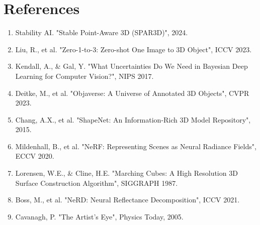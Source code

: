 \documentclass[10pt,journal,compsoc]{IEEEtran}
\begin{document}
\section*{References}
\begin{enumerate}
    \item Stability AI. "Stable Point-Aware 3D (SPAR3D)", 2024.
    \item Liu, R., et al. "Zero-1-to-3: Zero-shot One Image to 3D Object", ICCV 2023.
    \item Kendall, A., \& Gal, Y. "What Uncertainties Do We Need in Bayesian Deep Learning for Computer Vision?", NIPS 2017.
    \item Deitke, M., et al. "Objaverse: A Universe of Annotated 3D Objects", CVPR 2023.
    \item Chang, A.X., et al. "ShapeNet: An Information-Rich 3D Model Repository", 2015.
    \item Mildenhall, B., et al. "NeRF: Representing Scenes as Neural Radiance Fields", ECCV 2020.
    \item Lorensen, W.E., \& Cline, H.E. "Marching Cubes: A High Resolution 3D Surface Construction Algorithm", SIGGRAPH 1987.
    \item Boss, M., et al. "NeRD: Neural Reflectance Decomposition", ICCV 2021.
    \item Cavanagh, P. "The Artist's Eye", Physics Today, 2005.
\end{enumerate}
\end{document}

